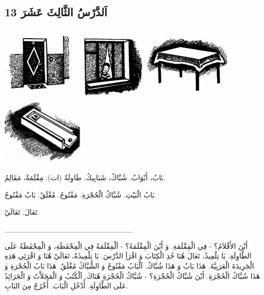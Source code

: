 \documentclass[a5paper]{article}
\begin{document}
\subsection{13 اَلدَّرْسُ الثَّالِثَ عَشَرَ}
 \includegraphics[width=1.4898in,height=1.4583in]{MuhammadBagauddinlatinized-img022.jpg}   \includegraphics[width=1.3228in,height=1.448in]{MuhammadBagauddinlatinized-img023.jpg}   \includegraphics[width=1.7083in,height=1.4689in]{MuhammadBagauddinlatinized-img024.jpg}   \includegraphics[width=1.5874in,height=1.2508in]{MuhammadBagauddinlatinized-img025.jpg} 

بَابٌ، أَبْوَابٌ. شُبَّاكٌ، شَبَابِيكُ. طَاوِلَةٌ (ات). مِقْلَمَةٌ، مَقَالِمُ.

بَابُ الْبَيْتِ. شُبَّاكُ الْحُجْرَةِ. مَفْتُوحٌ. مُغْلَقٌ. بَابٌ مَفْتُوحٌ.

تَعَالَ. تَعَالَيْ.

\_\_\_\_\_\_\_\_\_\_\_\_\_\_\_\_\_\_\_\_\_\_\_\_

أَيْنَ الأَقْلاَمُ؟ - فِي الْمِقْلَمَةِ. وَ أَيْنَ الْمِقْلَمَةُ؟ - اَلْمِقْلَمَةُ فِي الْمِحْفَظَةِ، وَ الْمِحْفَظَةُ عَلَى الطَّاوِلَةِ. يَا تِلْمِيذُ، تَعَالَ هُنَا خُذِ الْكِتَابَ وَ اقْرَأِ الدَّرْسَ. يَا تِلْمِيذَةُ، تَعَالَيْ هُنَا وَ اقْرَئِي هَذِهِ الْجَرِيدَةَ الْعَرَبِيَّةَ. هَذَا بَابٌ وَ هَذَا شُبَّاكٌ. اَلْبَابُ مَفْتُوحٌ وَ الشُّبَّاكُ مُغْلَقٌ. هَذَا بَابُ الْحُجْرَةِ وَ هَذَا شُبَّاكُ الْحُجْرَةِ. أَيْنَ شُبَّاكُ الْحُجْرَةِ؟ - شُبَّاكُ الْحُجْرَةِ هُنَاكَ. اَلْكُتُبُ وَ الْمَجَلاَّتُ وَ الْجَرَائِدُ عَلَى الطَّاوِلَةِ. أُدْخُلِ الْبَابَ. أُخْرُجْ مِنَ البَابِ.
\end{document}
